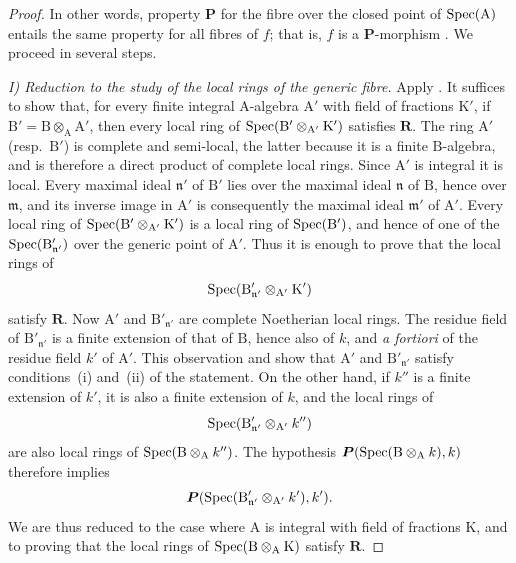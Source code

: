 \begin{proof}
In other words, property $\boldsymbol{P}$ for the fibre over the closed point of $\operatorname{Spec}(\mathrm{A})$ entails the same property for all fibres of $f$; that is, $f$ is a $\boldsymbol{P}$-morphism . We proceed in several steps.

\emph{I) Reduction to the study of the local rings of the generic fibre.} Apply . It suffices to show that, for every finite integral $\mathrm{A}$-algebra $\mathrm{A}'$ with field of fractions $\mathrm{K}'$, if $\mathrm{B}'=\mathrm{B}\otimes_\mathrm{A}\mathrm{A}'$, then every local ring of $\operatorname{Spec}(\mathrm{B}'\otimes_{\mathrm{A}'}\mathrm{K}')$ satisfies $\boldsymbol{R}$. The ring $\mathrm{A}'$ (resp.\ $\mathrm{B}'$) is complete and semi-local, the latter because it is a finite $\mathrm{B}$-algebra, and is therefore a direct product of complete local rings. Since $\mathrm{A}'$ is integral it is local. Every maximal ideal $\mathfrak{n}'$ of $\mathrm{B}'$ lies over the maximal ideal $\mathfrak{n}$ of $\mathrm{B}$, hence over $\mathfrak{m}$, and its inverse image in $\mathrm{A}'$ is consequently the maximal ideal $\mathfrak{m}'$ of $\mathrm{A}'$. Every local ring of $\operatorname{Spec}(\mathrm{B}'\otimes_{\mathrm{A}'}\mathrm{K}')$ is a local ring of $\operatorname{Spec}(\mathrm{B}')$, and hence of one of the $\operatorname{Spec}(\mathrm{B}'_{\mathfrak{n}'})$ over the generic point of $\mathrm{A}'$. Thus it is enough to prove that the local rings of
\[
  \operatorname{Spec}(\mathrm{B}'_{\mathfrak{n}'}\otimes_{\mathrm{A}'}\mathrm{K}')
\]
satisfy $\boldsymbol{R}$. Now $\mathrm{A}'$ and $\mathrm{B}'_{\mathfrak{n}'}$ are complete Noetherian local rings. The residue field of $\mathrm{B}'_{\mathfrak{n}'}$ is a finite extension of that of $\mathrm{B}$, hence also of $k$, and \emph{a fortiori} of the residue field $k'$ of $\mathrm{A}'$. This observation and  show that $\mathrm{A}'$ and $\mathrm{B}'_{\mathfrak{n}'}$ satisfy conditions~(i) and~(ii) of the statement. On the other hand, if $k''$ is a finite extension of $k'$, it is also a finite extension of $k$, and the local rings of
\[
  \operatorname{Spec}(\mathrm{B}'_{\mathfrak{n}'}\otimes_{\mathrm{A}'}k'')
\]
are also local rings of $\operatorname{Spec}(\mathrm{B}\otimes_\mathrm{A}k'')$. The hypothesis $\boldsymbol{P}(\operatorname{Spec}(\mathrm{B}\otimes_\mathrm{A}k),k)$ therefore implies
\[
  \boldsymbol{P}(\operatorname{Spec}(\mathrm{B}'_{\mathfrak{n}'}\otimes_{\mathrm{A}'}k'),k').
\]
We are thus reduced to the case where $\mathrm{A}$ is integral with field of fractions $\mathrm{K}$, and to proving that the local rings of $\operatorname{Spec}(\mathrm{B}\otimes_\mathrm{A}\mathrm{K})$ satisfy $\boldsymbol{R}$.


\end{proof}
